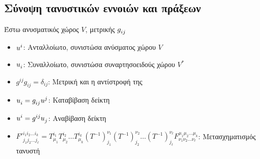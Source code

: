 \documentclass[main.tex]{subfiles}
\begin{document}
	\subsection{Σύνοψη τανυστικών εννοιών και πράξεων}
	Έστω ανυσματικός χώρος $V$, μετρικής $g\indices{_i_j}$
	\begin{itemize}
		\item $u\indices{^i}$: Ανταλλοίωτο, συνιστώσα ανύσματος χώρου $V$
		\item $u\indices{_i}$: Συναλλοίωτο, συνιστώσα συναρτησοειδούς χώρου $V^*$
		\item $g^{ij}g_{ij}=\delta_{ij}$: Μετρική και η αντίστροφή της
		\item $u\indices{_i} = g\indices{_i_j}u\indices{^j}$: Καταβίβαση δείκτη
		\item $u\indices{^i} = g\indices{^i^j}u\indices{_j}$: Αναβίβαση δείκτη
		\item $F'^{i_1i_2\ldots i_k}_{j_1j_2\ldots j_\ell} = T^{i_1}_{\mu_1}T^{i_2}_{\mu_2}\ldots T^{i_k}_{\mu_k}(T^{-1})^{\nu_1}_{j_1}(T^{-1})^{\nu_2}_{j_2}\ldots(T^{-1})^{\nu_\ell}_{j_\ell}F^{\mu_1\mu_2\ldots \mu_k}_{\nu_1\nu_2\ldots \nu_\ell}$: Μετασχηματισμός τανυστή
	\end{itemize}
\end{document}
